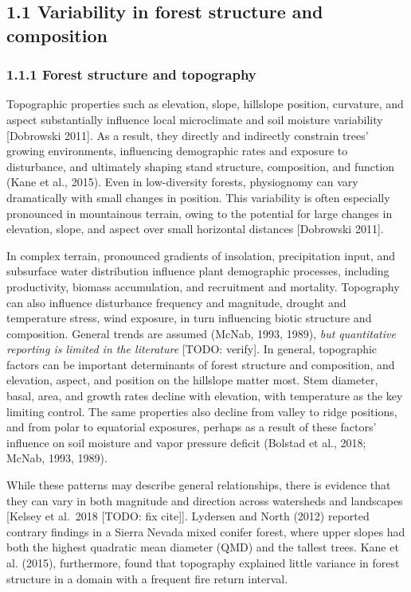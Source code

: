 \documentclass[
  12pt,
]{article}
\begin{document}
\subsection{1.1 Variability in forest structure and
composition}\label{variability-in-forest-structure-and-composition}

\subsubsection{1.1.1 Forest structure and
topography}\label{forest-structure-and-topography}

Topographic properties such as elevation, slope, hillslope position,
curvature, and aspect substantially influence local microclimate and
soil moisture variability {[}Dobrowski 2011{]}. As a result, they
directly and indirectly constrain trees' growing environments,
influencing demographic rates and exposure to disturbance, and
ultimately shaping stand structure, composition, and function (Kane et
al., 2015). Even in low-diversity forests, physiognomy can vary
dramatically with small changes in position. This variability is often
especially pronounced in mountainous terrain, owing to the potential for
large changes in elevation, slope, and aspect over small horizontal
distances {[}Dobrowski 2011{]}.

In complex terrain, pronounced gradients of insolation, precipitation
input, and subsurface water distribution influence plant demographic
processes, including productivity, biomass accumulation, and recruitment
and mortality. Topography can also influence disturbance frequency and
magnitude, drought and temperature stress, wind exposure, in turn
influencing biotic structure and composition. General trends are assumed
(McNab, 1993, 1989), \emph{but quantitative reporting is limited in the
literature} {[}TODO: verify{]}. In general, topographic factors can be
important determinants of forest structure and composition, and
elevation, aspect, and position on the hillslope matter most. Stem
diameter, basal, area, and growth rates decline with elevation, with
temperature as the key limiting control. The same properties also
decline from valley to ridge positions, and from polar to equatorial
exposures, perhaps as a result of these factors' influence on soil
moisture and vapor pressure deficit (Bolstad et al., 2018; McNab, 1993,
1989).

While these patterns may describe general relationships, there is
evidence that they can vary in both magnitude and direction across
watersheds and landscapes {[}Kelsey et al.~2018 {[}TODO: fix cite{]}{]}.
Lydersen and North (2012) reported contrary findings in a Sierra Nevada
mixed conifer forest, where upper slopes had both the highest quadratic
mean diameter (QMD) and the tallest trees. Kane et al. (2015),
furthermore, found that topography explained little variance in forest
structure in a domain with a frequent fire return interval.
\end{document}
